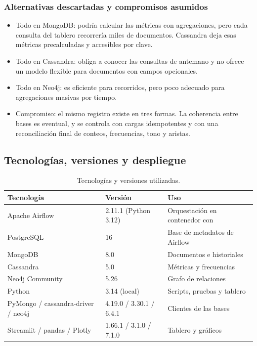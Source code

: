 \documentclass[11pt,a4paper]{article}
\newcommand{\code}[1]{\detokenize{#1}}
\begin{document}
\subsubsection{Alternativas descartadas y compromisos asumidos}

\begin{itemize}
    \item Todo en MongoDB: podría calcular las métricas con agregaciones, pero cada consulta del tablero recorrería miles de documentos. Cassandra deja esas métricas precalculadas y accesibles por clave.
    \item Todo en Cassandra: obliga a conocer las consultas de antemano y no ofrece un modelo flexible para documentos con campos opcionales.
    \item Todo en Neo4j: es eficiente para recorridos, pero poco adecuado para agregaciones masivas por tiempo.
    \item Compromiso: el mismo registro existe en tres formas. La coherencia entre bases es eventual, y se controla con cargas idempotentes y con una reconciliación final de conteos, frecuencias, tono y aristas.
\end{itemize}

\subsection{Tecnologías, versiones y despliegue}

\begin{table}[H]
\centering
\small
\begin{tabular}{@{}llp{6.2cm}@{}}
\toprule
Tecnología & Versión & Uso \\
\midrule
Apache Airflow & 2.11.1 (Python 3.12) & Orquestación en contenedor con \code{LocalExecutor} \\
PostgreSQL & 16 & Base de metadatos de Airflow \\
MongoDB & 8.0 & Documentos e historiales \\
Cassandra & 5.0 & Métricas y frecuencias \\
Neo4j Community & 5.26 & Grafo de relaciones \\
Python & 3.14 (local) & Scripts, pruebas y tablero \\
PyMongo / cassandra-driver / neo4j & 4.19.0 / 3.30.1 / 6.4.1 & Clientes de las bases \\
Streamlit / pandas / Plotly & 1.66.1 / 3.1.0 / 7.1.0 & Tablero y gráficos \\
\bottomrule
\end{tabular}
\caption{Tecnologías y versiones utilizadas.}
\end{table}
\end{document}
